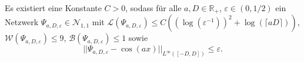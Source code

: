 \documentclass[11pt]{scrartcl}
\newcommand{\R}{\mathbb{R}} %
\begin{document}
\begin{theorem} %
	\newcommand{\Psia}{\Psi_{a,D,\varepsilon}}
	Es existiert eine Konstante \(C>0\), sodass für alle \(a,D\in \R_+\), \(\varepsilon \in (0,1/2)\) 
	ein Netzwerk \(\Psia \in \mathcal{N}_{1,1}\) mit \(\mathcal{L}(\Psia) \leq C((\log(\varepsilon^{-1}))^2 + \log(\lceil aD\rceil))\), 
	\(\mathcal{W}(\Psia) \leq 9\), \(\mathcal{B}(\Psia) \leq 1\) sowie 
	\[ ||\Psia - \cos(a x) ||_{L^{\infty}([-D,D])} \leq \varepsilon. \]
\end{theorem}

\nocite{Grohs2019}
\printbibliography{}
\end{document}
